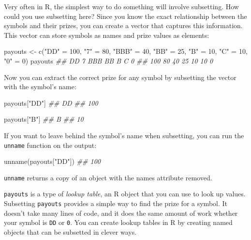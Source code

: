 \documentclass[
  letterpaper,
  DIV=11,
  numbers=noendperiod]{scrbook}
\newenvironment{Shaded}{\begin{snugshade}}{\end{snugshade}}
\newcommand{\DecValTok}[1]{\textcolor[rgb]{0.68,0.00,0.00}{#1}}
\newcommand{\DocumentationTok}[1]{\textcolor[rgb]{0.37,0.37,0.37}{\textit{#1}}}
\newcommand{\FunctionTok}[1]{\textcolor[rgb]{0.28,0.35,0.67}{#1}}
\newcommand{\NormalTok}[1]{\textcolor[rgb]{0.00,0.23,0.31}{#1}}
\newcommand{\OtherTok}[1]{\textcolor[rgb]{0.00,0.23,0.31}{#1}}
\newcommand{\StringTok}[1]{\textcolor[rgb]{0.13,0.47,0.30}{#1}}
\begin{document}
Very often in R, the simplest way to do something will involve
subsetting. How could you use subsetting here? Since you know the exact
relationship between the symbols and their prizes, you can create a
vector that captures this information. This vector can store symbols as
names and prize values as elements:

\begin{Shaded}
\begin{Highlighting}[]
\NormalTok{payouts }\OtherTok{\textless{}{-}} \FunctionTok{c}\NormalTok{(}\StringTok{"DD"} \OtherTok{=} \DecValTok{100}\NormalTok{, }\StringTok{"7"} \OtherTok{=} \DecValTok{80}\NormalTok{, }\StringTok{"BBB"} \OtherTok{=} \DecValTok{40}\NormalTok{, }\StringTok{"BB"} \OtherTok{=} \DecValTok{25}\NormalTok{, }
  \StringTok{"B"} \OtherTok{=} \DecValTok{10}\NormalTok{, }\StringTok{"C"} \OtherTok{=} \DecValTok{10}\NormalTok{, }\StringTok{"0"} \OtherTok{=} \DecValTok{0}\NormalTok{)}
\NormalTok{payouts}
\DocumentationTok{\#\#  DD   7 BBB  BB   B   C   0 }
\DocumentationTok{\#\# 100  80  40  25  10  10   0 }
\end{Highlighting}
\end{Shaded}

Now you can extract the correct prize for any symbol by subsetting the
vector with the symbol's name:

\begin{Shaded}
\begin{Highlighting}[]
\NormalTok{payouts[}\StringTok{"DD"}\NormalTok{]}
\DocumentationTok{\#\#  DD }
\DocumentationTok{\#\# 100 }

\NormalTok{payouts[}\StringTok{"B"}\NormalTok{]}
\DocumentationTok{\#\#  B}
\DocumentationTok{\#\# 10}
\end{Highlighting}
\end{Shaded}

If you want to leave behind the symbol's name when subsetting, you can
run the \texttt{unname} function on the output:

\begin{Shaded}
\begin{Highlighting}[]
\FunctionTok{unname}\NormalTok{(payouts[}\StringTok{"DD"}\NormalTok{])}
\DocumentationTok{\#\# 100 }
\end{Highlighting}
\end{Shaded}

\texttt{unname} returns a copy of an object with the names attribute
removed.

\texttt{payouts} is a type of \emph{lookup table}, an R object that you
can use to look up values. Subsetting \texttt{payouts} provides a simple
way to find the prize for a symbol. It doesn't take many lines of code,
and it does the same amount of work whether your symbol is \texttt{DD}
or \texttt{0}. You can create lookup tables in R by creating named
objects that can be subsetted in clever ways.
\end{document}
